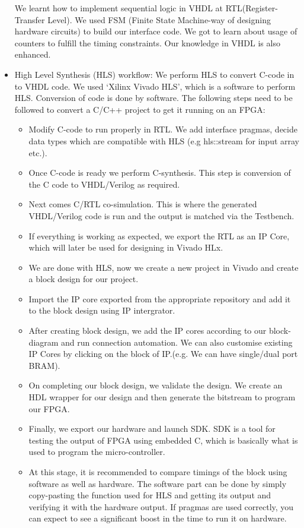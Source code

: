 \documentclass[../../main.tex]{subfiles}
\begin{document}
\begin{itemize}
    We learnt how to implement sequential logic in VHDL at RTL(Register-Transfer Level). We used FSM (Finite State Machine-way of designing hardware circuits) to build our interface code. We got to learn about usage of counters to fulfill the timing constraints. Our knowledge in VHDL is also enhanced.
    \item High Level Synthesis (HLS) workflow: We perform HLS to convert C-code in to VHDL code. We used `Xilinx Vivado HLS', which is a software to perform HLS. Conversion of code is done by software. The following steps need to be followed to convert a C/C++ project to get it running on an FPGA:
    \begin{itemize}
        \item Modify C-code to run properly in RTL. We add interface pragmas, decide data types which are compatible with HLS (e.g hls::stream for input array etc.).
        \item Once C-code is ready we perform C-synthesis. This step is conversion of the C code to VHDL/Verilog as required.
        \item Next comes C/RTL co-simulation. This is where the generated VHDL/Verilog code is run and the output is matched via the Testbench. 
        \item If everything is working as expected, we export the RTL as an IP Core, which will later be used for designing in Vivado HLx.
        \item We are done with HLS, now we create a new project in Vivado and create a block design for our project.
        \item Import the IP core exported from the appropriate repository and add it to the block design using IP intergrator.
        \item After creating block design, we add the IP cores according to our block-diagram and run connection automation. We can also customise existing IP Cores by  clicking on the block of IP.(e.g. We can have single/dual port BRAM).
        \item On completing our block design, we validate the design. We create an HDL wrapper for our design and then generate the bitstream to program our FPGA.
        \item Finally, we export our hardware and launch SDK. SDK is a tool for testing the output of FPGA using embedded C, which is basically what is used to program the micro-controller.
        \item At this stage, it is recommended to compare timings of the block using software as well as hardware. The software part can be done by simply copy-pasting the function used for HLS and getting its output and verifying it with the hardware output. If pragmas are used correctly, you can expect to see a significant boost in the time to run it on hardware.
    \end{itemize}
    

\end{itemize}
\end{document}
